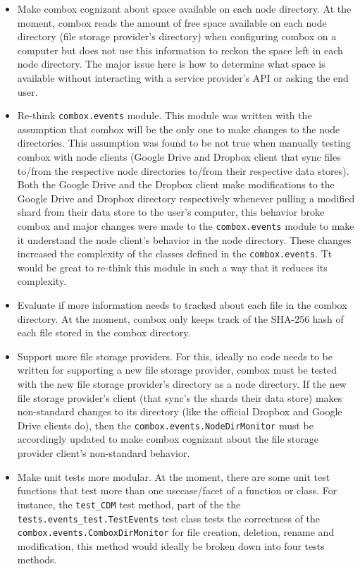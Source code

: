 \begin{itemize}
\item Make combox cognizant about space available on each node
  directory. At the moment, combox reads the amount of free space
  available on each node directory (file storage provider's directory)
  when configuring combox on a computer but does not use this
  information to reckon the space left in each node directory. The
  major issue here is how to determine what space is available without
  interacting with a service provider's API or asking the end user.


\item Re-think \verb+combox.events+ module. This module was written
  with the assumption that combox will be the only one to make changes
  to the node directories. This assumption was found to be not true
  when manually testing combox with node clients (Google Drive and
  Dropbox client that sync files to/from the respective node
  directories to/from their respective data stores). Both the Google
  Drive and the Dropbox client make modifications to the Google Drive
  and Dropbox directory respectively whenever pulling a modified shard
  from their data store to the user's computer, this behavior broke
  combox and major changes were made to the \verb+combox.events+
  module to make it understand the node client's behavior in the node
  directory. These changes increased the complexity of the classes
  defined in the \verb+combox.events+. Tt would be great to re-think
  this module in such a way that it reduces its complexity.

\item Evaluate if more information needs to tracked about each file in
  the combox directory. At the moment, combox only keeps track of the
  SHA-256 hash of each file stored in the combox directory.

\item Support more file storage providers. For this, ideally no code
  needs to be written for supporting a new file storage provider,
  combox must be tested with the new file storage provider's directory
  as a node directory. If the new file storage provider's client (that
  sync's the shards their data store) makes non-standard changes to
  its directory (like the official Dropbox and Google Drive clients
  do), then the \verb+combox.events.NodeDirMonitor+ must be
  accordingly updated to make combox cognizant about the file storage
  provider client's non-standard behavior.

\item Make unit tests more modular. At the moment, there are some unit
  test functions that test more than one usecase/facet of a function
  or class. For instance, the \verb+test_CDM+ test method, part of the
  the \verb+tests.events_test.TestEvents+ test class tests the
  correctness of the \verb+combox.events.ComboxDirMonitor+ for file
  creation, deletion, rename and modification, this method would
  ideally be broken down into four tests methods.


\end{itemize}
